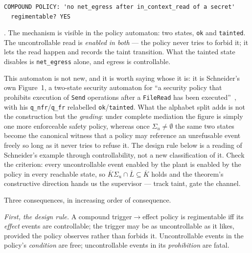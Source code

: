 \documentclass[11pt,a4paper]{article}  \usepackage{mdframed} \usepackage{graphicx}
\begin{document}
\begin{verbatim}
COMPOUND POLICY: 'no net_egress after in_context_read of a secret'
  regimentable? YES
\end{verbatim}

. The mechanism is visible in the policy automaton: two states,
\texttt{ok} and \texttt{tainted}. The uncontrollable read is \emph{enabled in both} --- the policy never tries to forbid it;
it lets the read happen and records the taint transition. What the tainted state disables is \texttt{net\_egress} alone, and
egress is controllable.

This automaton is not new, and it is worth saying whose it is: it is Schneider's own Figure~1, a two-state security automaton
for ``a security policy that prohibits execution of \texttt{Send} operations after a \texttt{FileRead} has been
executed''~\cite{schneider}, with his \texttt{q\_nfr}/\texttt{q\_fr} relabelled \texttt{ok}/\texttt{tainted}. What the
alphabet split adds is not the construction but the \emph{grading}: under complete mediation the figure is simply one more
enforceable safety policy, whereas once $\Sigma_u\neq\emptyset$ the same two states become the canonical witness that a
policy may reference an unrefusable event freely so long as it never tries to refuse it. The design rule below is a reading
of Schneider's example through controllability, not a new classification of it. Check the criterion: every uncontrollable event enabled by the plant is enabled by the policy in
every reachable state, so $\overline{K}\Sigma_u\cap\overline{L}\subseteq\overline{K}$ holds and the theorem's constructive
direction hands us the supervisor --- track taint, gate the channel.

Three consequences, in increasing order of consequence.

\emph{First, the design rule.} A compound trigger$\to$effect policy is regimentable iff its \emph{effect} events are
controllable; the trigger may be as uncontrollable as it likes, provided the policy observes rather than forbids it.
Uncontrollable events in the policy's \emph{condition} are free; uncontrollable events in its \emph{prohibition} are fatal.
\end{document}
